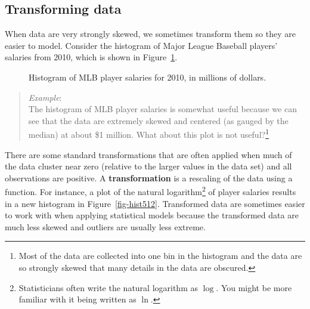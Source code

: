 \documentclass[
  letterpaper,
  DIV=11,
  numbers=noendperiod]{scrreprt}
\begin{document}
\subsection{Transforming data}\label{transforming-data}

When data are very strongly skewed, we sometimes transform them so they
are easier to model. Consider the histogram of Major League Baseball
players' salaries from 2010, which is shown in Figure~\ref{fig-hist510}.

\begin{figure}


\caption{\label{fig-hist510}Histogram of MLB player salaries for 2010,
in millions of dollars.}

\end{figure}%

\begin{quote}
\emph{Example}:\\
The histogram of MLB player salaries is somewhat useful because we can
see that the data are extremely skewed and centered (as gauged by the
median) at about \$1 million. What about this plot is not
useful?\footnote{Most of the data are collected into one bin in the
  histogram and the data are so strongly skewed that many details in the
  data are obscured.}
\end{quote}

There are some standard transformations that are often applied when much
of the data cluster near zero (relative to the larger values in the data
set) and all observations are positive. A \textbf{transformation} is a
rescaling of the data using a function. For instance, a plot of the
natural logarithm\footnote{Statisticians often write the natural
  logarithm as \(\log\). You might be more familiar with it being
  written as \(\ln\).} of player salaries results in a new histogram in
Figure~\ref{fig-hist512}. Transformed data are sometimes easier to work
with when applying statistical models because the transformed data are
much less skewed and outliers are usually less extreme.
\end{document}
